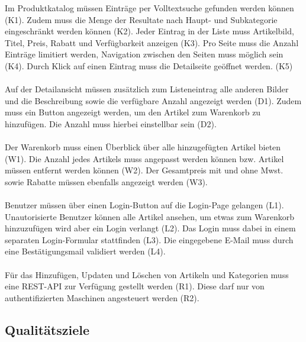 \documentclass[
]{article}
\begin{document}
Im Produktkatalog müssen Einträge per Volltextsuche gefunden werden können (K1). Zudem muss die Menge der Resultate nach Haupt- und Subkategorie eingeschränkt werden können (K2). Jeder Eintrag in der Liste muss Artikelbild, Titel, Preis, Rabatt und Verfügbarkeit anzeigen (K3). Pro Seite muss die Anzahl Einträge limitiert werden, Navigation zwischen den Seiten muss möglich sein (K4). Durch Klick auf einen Eintrag muss die Detailseite geöffnet werden. (K5)  \\ \\
Auf der Detailansicht müssen zusätzlich zum Listeneintrag alle anderen Bilder und die Beschreibung sowie die verfügbare Anzahl angezeigt werden (D1). Zudem muss ein Button angezeigt werden, um den Artikel zum Warenkorb zu hinzufügen. Die Anzahl muss hierbei einstellbar sein (D2). \\ \\
Der Warenkorb muss einen Überblick über alle hinzugefügten Artikel bieten (W1). Die Anzahl jedes Artikels muss angepasst werden können bzw. Artikel müssen entfernt werden können (W2). Der Gesamtpreis mit und ohne Mwst. sowie Rabatte müssen ebenfalls angezeigt werden (W3). \\ \\
Benutzer müssen über einen Login-Button auf die Login-Page gelangen (L1). Unautorisierte Benutzer können alle Artikel ansehen, um etwas zum Warenkorb hinzuzufügen wird aber ein Login verlangt (L2). Das Login muss dabei in einem separaten Login-Formular stattfinden (L3). Die eingegebene E-Mail muss durch eine Bestätigungsmail validiert werden (L4). \\ \\
Für das Hinzufügen, Updaten und Löschen von Artikeln und Kategorien muss eine REST-API zur Verfügung gestellt werden (R1). Diese darf nur von authentifizierten Maschinen angesteuert werden (R2).


\hypertarget{_qualit_tsziele}{%
\subsection{Qualitätsziele}\label{_qualit_tsziele}}
\end{document}
